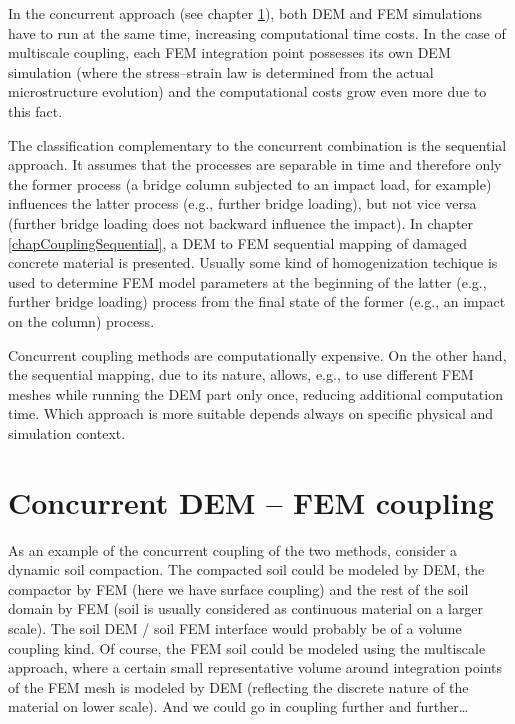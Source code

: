In the concurrent approach (see chapter \ref{chapCouplingConcurent}), both DEM and FEM simulations have to run at the same time, increasing computational time costs.
In the case of multiscale coupling, each FEM integration point possesses its own DEM simulation (where the stress--strain law is determined from the actual microstructure evolution) and the computational costs grow even more due to this fact.

The classification complementary to the concurrent combination is the sequential approach.
It assumes that the processes are separable in time and therefore only the former process
(a bridge column subjected to an impact load, for example)
influences the latter process
(e.g., further bridge loading),
but not vice versa
(further bridge loading does not backward influence the impact).
In chapter \ref{chapCouplingSequential}, a DEM to FEM sequential mapping of damaged concrete material is presented.
Usually some kind of homogenization techique is used to determine FEM model parameters at the beginning of the latter
(e.g., further bridge loading)
process from the final state of the former
(e.g., an impact on the column)
process.

Concurrent coupling methods are computationally expensive.
On the other hand, the sequential mapping, due to its  nature, allows, e.g., to use different FEM meshes while running the DEM part only once, reducing additional computation time.
Which approach is more suitable depends always on specific physical and simulation context.






\chapter{Concurrent DEM -- FEM coupling}\label{chapCouplingConcurent}

As an example of the concurrent coupling of the two methods, consider a dynamic soil compaction.
The compacted soil could be modeled by DEM, the compactor by FEM (here we have surface coupling) and the rest of the soil domain by FEM (soil is usually considered as continuous material on a larger scale).
The soil DEM / soil FEM interface would probably be of a volume coupling kind.
Of course, the FEM soil could be modeled using the multiscale approach, where a certain small representative volume around integration points of the FEM mesh is modeled by DEM (reflecting the discrete nature of the material on lower scale).
And we could go in coupling further and further\dots

